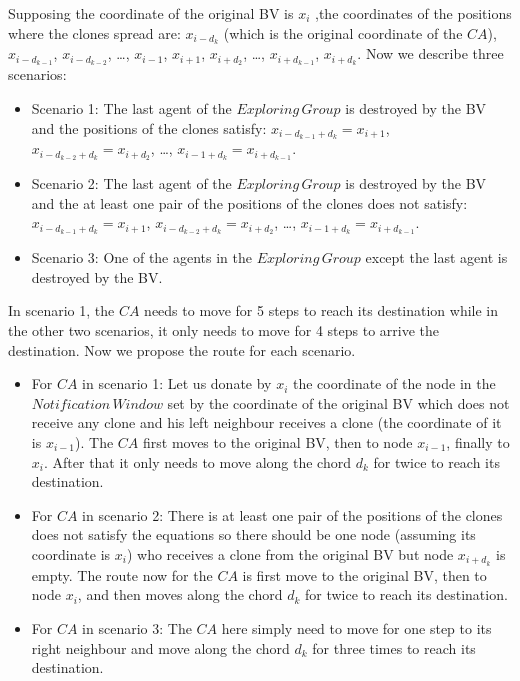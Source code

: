 Supposing the coordinate of the original BV is $x_i$ ,the coordinates of the positions where the clones spread are: $x_{i-d_k}$ (which is the original coordinate of the $CA$), $x_{i-d_{k-1}}$, $x_{i-d_{k-2}}$, \ldots, $x_{i-1}$, $x_{i+1}$, $x_{i+d_2}$, \ldots, $x_{i+d_{k-1}}$, $x_{i+d_{k}}$.
Now we describe three scenarios:
\begin{itemize}
\item Scenario 1: The last agent of the $Exploring\,Group$ is destroyed by the BV and the positions of the clones satisfy: $x_{i-d_{k-1}+d_{k}}=x_{i+1}$, $x_{i-d_{k-2}+d_{k}}=x_{i+d_2}$, \ldots, $x_{{i-1}+d_{k}}=x_{i+d_{k-1}}$. 
\item Scenario 2: The last agent of the $Exploring\,Group$ is destroyed by the BV and the at least one pair of the positions of the clones does not satisfy: $x_{i-d_{k-1}+d_{k}}=x_{i+1}$, $x_{i-d_{k-2}+d_{k}}=x_{i+d_2}$, \ldots, $x_{{i-1}+d_{k}}=x_{i+d_{k-1}}$. 
\item Scenario 3: One of the agents in the $Exploring\,Group$ except the last agent is destroyed by the BV.
\end{itemize}

In scenario 1, the $CA$ needs to move for 5 steps to reach its destination while in the other two scenarios, it only needs to move for 4 steps to arrive the destination. Now we propose the route for each scenario.
\begin{itemize}
\item For $CA$ in scenario 1: Let us donate by $x_i$ the coordinate of the node in the $Notification\,Window$ set by the coordinate of the original BV which does not receive any clone and his left neighbour receives a clone (the coordinate of it is $x_{i-1}$). The $CA$ first moves to the original BV, then to node $x_{i-1}$, finally to $x_i$. After that it only needs to move along the chord $d_k$ for twice to reach its destination.
\item For $CA$ in scenario 2: There is at least one pair of the positions of the clones does not satisfy the equations so there should be one node (assuming its coordinate is $x_i$) who receives a clone from the original BV but node $x_{i+d_k}$ is empty. The route now for the $CA$ is first move to the original BV, then to node $x_i$, and then moves along the chord $d_k$ for twice to reach its destination.
\item For $CA$ in scenario 3: The $CA$ here simply need to move for one step to its right neighbour and move along the chord $d_k$ for three times to reach its destination.
\end{itemize}

